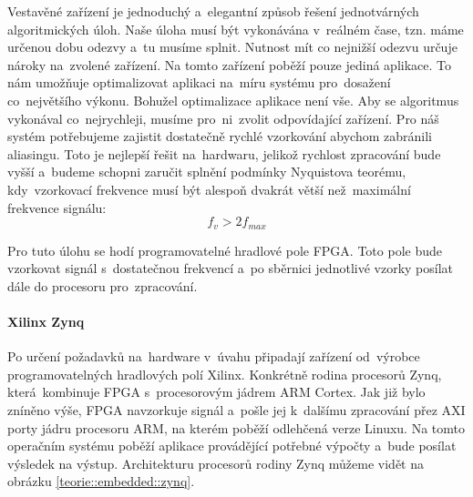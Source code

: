 			Vestavěné zařízení je jednoduchý a~elegantní způsob řešení jednotvárných algoritmických úloh. Naše úloha musí být vykonávána v~reálném čase, tzn. máme určenou dobu odezvy a~tu musíme splnit. Nutnost mít co nejnižší odezvu určuje nároky na~zvolené zařízení. Na tomto zařízení poběží pouze jediná aplikace. To nám umožňuje optimalizovat aplikaci na~míru systému pro~dosažení co~největšího výkonu.
			Bohužel optimalizace aplikace není vše. Aby se algoritmus vykonával co~nejrychleji, musíme pro~ni~zvolit odpovídající zařízení. Pro náš systém potřebujeme zajistit dostatečně rychlé vzorkování abychom zabránili aliasingu. Toto je nejlepší řešit na~hardwaru, jelikož rychlost zpracování bude vyšší a~budeme schopni zaručit splnění podmínky Nyquistova teorému, kdy~vzorkovací frekvence musí být alespoň dvakrát větší než~maximální frekvence signálu: \[f_v > 2f_{max}\]
			
			Pro tuto úlohu se hodí programovatelné hradlové pole FPGA. Toto pole bude vzorkovat signál s~dostatečnou frekvencí a~po sběrnici jednotlivé vzorky posílat dále do procesoru pro~zpracování.\par
			
			\paragraph{Xilinx Zynq}
				Po určení požadavků na~hardware v~úvahu připadají zařízení od~výrobce programovatelných hradlových polí Xilinx. Konkrétně rodina procesorů Zynq, která~kombinuje FPGA s~procesorovým jádrem ARM Cortex. \cite {zynq}
				Jak již bylo zníněno výše, FPGA navzorkuje signál a~pošle jej k~dalšímu zpracování přez AXI porty jádru procesoru ARM, na kterém poběží odlehčená verze Linuxu. Na tomto operačním systému poběží aplikace provádějící potřebné výpočty a~bude posílat výsledek na výstup.	Architekturu procesorů rodiny Zynq můžeme vidět na obrázku \ref{teorie::embedded::zynq}.			
